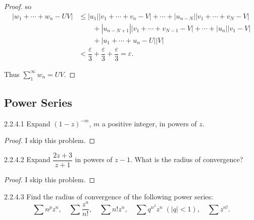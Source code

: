 \begin{proof}
	so
	\begingroup
	\allowdisplaybreaks%
	\begin{align*}
		\left\vert w_{1} + \cdots + w_{n} - UV \right\vert & \le \left\vert u_{1} \right\vert \left\vert v_{1} + \cdots + v_{n} - V \right\vert + \cdots + \left\vert u_{n-N} \right\vert \left\vert v_{1} + \cdots + v_{N} - V\right\vert \\
		                                                   & \qquad + \left\vert u_{n-N+1}\right\vert \left\vert v_{1} + \cdots + v_{N-1} - V\right\vert + \cdots + \left\vert u_{n}\right\vert \left\vert v_{1} - V\right\vert            \\
		                                                   & \qquad + \left\vert u_{1} + \cdots + u_{n} - U \right\vert \left\vert V \right\vert                                                                                           \\
		                                                   & < \dfrac{\varepsilon}{3} + \dfrac{\varepsilon}{3} + \dfrac{\varepsilon}{3} = \varepsilon.
	\end{align*}
	\endgroup

	Thus \( \sum_{1}^{\infty} w_{n} = UV \).
\end{proof}

\subsection{Power Series}

\begin{problem}{2.2.4.1}
Expand \( {(1 - z)}^{-m} \), \( m \) a positive integer, in powers of \( z \).
\end{problem}

\begin{proof}
	I skip this problem.
\end{proof}

\begin{problem}{2.2.4.2}
Expand \( \dfrac{2z+3}{z+1} \) in powers of \( z - 1 \). What is the radius of convergence?
\end{problem}

\begin{proof}
	I skip this problem.
\end{proof}

\begin{problem}{2.2.4.3}
Find the radius of convergence of the following power series:
\[
	\sum n^{p} z^{n}, \quad \sum \frac{z^{n}}{n!}, \quad \sum n! z^{n}, \quad \sum q^{n^{2}} z^{n} \; (|q|<1), \quad \sum z^{n!}.
\]
\end{problem}

